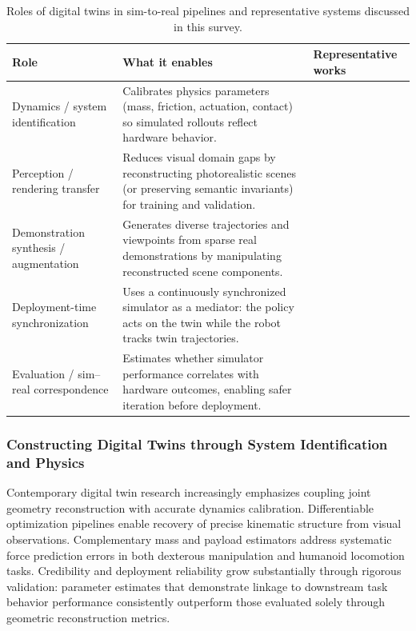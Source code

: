 ﻿\documentclass[11pt,a4paper]{article}
\begin{document}
\begin{table}[htbp]
\centering
\caption{Roles of digital twins in sim-to-real pipelines and representative systems discussed in this survey.}
\label{tab:digital_twin_roles}
\renewcommand{\arraystretch}{1.2}
\small
\begin{tabularx}{\textwidth}{@{}p{2.8cm}X p{4.5cm}@{}}
\toprule
Role & What it enables & Representative works \\
\midrule
Dynamics / system identification & Calibrates physics parameters (mass, friction, actuation, contact) so simulated rollouts reflect hardware behavior. & \cite{tan2018simtoreal, heiden2022inferring, lou2026drex} \\
Perception / rendering transfer & Reduces visual domain gaps by reconstructing photorealistic scenes (or preserving semantic invariants) for training and validation. & \cite{qureshi2025splatsim, tang2025semantic} \\
Demonstration synthesis / augmentation & Generates diverse trajectories and viewpoints from sparse real demonstrations by manipulating reconstructed scene components. & \cite{yang2025robosplat, yu2025real2render2real} \\
Deployment-time synchronization & Uses a continuously synchronized simulator as a mediator: the policy acts on the twin while the robot tracks twin trajectories. & \cite{abou2024realissim} \\
Evaluation / sim--real correspondence & Estimates whether simulator performance correlates with hardware outcomes, enabling safer iteration before deployment. & \cite{jain2025polaris, li2024simpler} \\
\bottomrule
\end{tabularx}
\end{table}

\subsubsection{Constructing Digital Twins through System Identification and Physics}

Contemporary digital twin research increasingly emphasizes coupling joint geometry reconstruction with accurate dynamics calibration. Differentiable optimization pipelines enable recovery of precise kinematic structure from visual observations. Complementary mass and payload estimators address systematic force prediction errors in both dexterous manipulation and humanoid locomotion tasks. Credibility and deployment reliability grow substantially through rigorous validation: parameter estimates that demonstrate linkage to downstream task behavior performance consistently outperform those evaluated solely through geometric reconstruction metrics.
\end{document}
